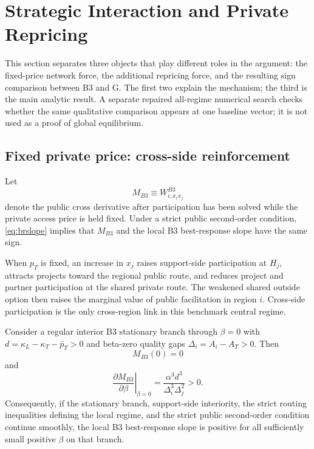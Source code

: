 \section{Strategic Interaction and Private Repricing}\label{sec:mainresult}

This section separates three objects that play different roles in the argument: the fixed-price network force, the additional repricing force, and the resulting sign comparison between B3 and G. The first two explain the mechanism; the third is the main analytic result. A separate repaired all-regime numerical search checks whether the same qualitative comparison appears at one baseline vector; it is not used as a proof of global equilibrium.

\subsection{Fixed private price: cross-side reinforcement}

Let
\[
M_{B3}\equiv W_{i,x_ix_j}^{B3}
\]
denote the public cross derivative after participation has been solved while the private access price is held fixed. Under a strict public second-order condition, \eqref{eq:brslope} implies that $M_{B3}$ and the local B3 best-response slope have the same sign.

When $p_T$ is fixed, an increase in $x_j$ raises support-side participation at $H_j$, attracts projects toward the regional public route, and reduces project and partner participation at the shared private route. The weakened shared outside option then raises the marginal value of public facilitation in region $i$. Cross-side participation is the only cross-region link in this benchmark central regime.

\begin{proposition}\label{prop:b3local}
Consider a regular interior B3 stationary branch through $\beta=0$ with $d=\kappa_L-\kappa_T-\bar p_T>0$ and beta-zero quality gaps $\Delta_i=A_i-A_T>0$. Then
\[
M_{B3}(0)=0
\]
and
\begin{equation}
\left.\frac{\partial M_{B3}}{\partial\beta}\right|_{\beta=0}
=
\frac{\alpha^3d^3}{\Delta_i^3\Delta_j^2}>0.
\label{eq:b3betaderivative}
\end{equation}
Consequently, if the stationary branch, support-side interiority, the strict routing inequalities defining the local regime, and the strict public second-order condition continue smoothly, the local B3 best-response slope is positive for all sufficiently small positive $\beta$ on that branch.
\end{proposition}


